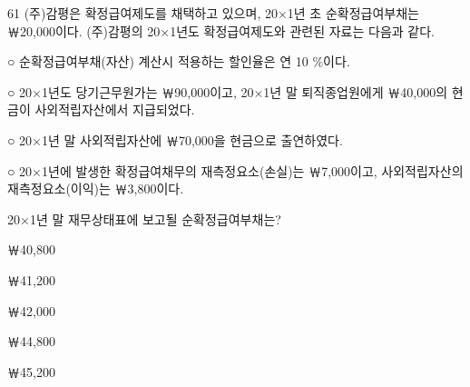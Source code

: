 \begin{question}{61}
(주)감평은 확정급여제도를 채택하고 있으며, 20×1년 초 순확정급여부채는 ￦20,000이다. (주)감평의 20×1년도 확정급여제도와 관련된 자료는 다음과 같다.
\begin{framedtext}
○ 순확정급여부채(자산) 계산시 적용하는 할인율은 연 10 \%이다. \par
○ 20×1년도 당기근무원가는 ￦90,000이고, 20×1년 말 퇴직종업원에게 ￦40,000의 현금이 사외적립자산에서 지급되었다. \par
○ 20×1년 말 사외적립자산에 ￦70,000을 현금으로 출연하였다. \par
○ 20×1년에 발생한 확정급여채무의 재측정요소(손실)는 ￦7,000이고, 사외적립자산의 재측정요소(이익)는 ￦3,800이다. \par
\end{framedtext}
20×1년 말 재무상태표에 보고될 순확정급여부채는? \par
\begin{choices}
  \item ￦40,800
  \item ￦41,200
  \item ￦42,000
  \item ￦44,800
  \item ￦45,200
\end{choices}
\end{question}
